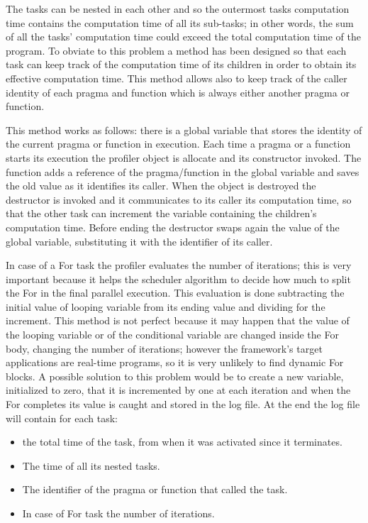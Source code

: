\documentclass[a4paper,11pt,oneside]{book}
\begin{document}
The tasks can be nested in each other and so the outermost tasks computation time contains the computation time of all its sub-tasks; in other words, the sum of all the tasks’ computation time could exceed the total computation time of the program. To obviate to this problem a method has been designed so that each task can keep track of the computation time of its children in order to obtain its effective computation time. This method allows also to keep track of the caller identity of each pragma and function which is always either another pragma or function.

This method works as follows: there is a global variable that stores the identity of the current pragma or function in execution. Each time a pragma or a function starts its execution the profiler object is allocate and its constructor invoked. The function adds a reference of the pragma/function in the global variable and saves the old value as it identifies its caller. When the object is destroyed the destructor is invoked and it communicates to its caller its computation time, so that the other task can increment the variable containing the children's computation time. Before ending the destructor swaps again the value of the global variable, substituting it with the identifier of its caller. 

In case of a For task the profiler evaluates the number of iterations; this is very important because it helps the scheduler algorithm to decide how much to split the For in the final parallel execution. This evaluation is done subtracting the initial value of looping variable from its ending value and dividing for the increment. This method is not perfect because it may happen that the value of the looping variable or of the conditional variable are changed inside the For body, changing the number of iterations; however the framework’s target applications are real-time programs, so it is very unlikely to find dynamic For blocks. A possible solution to this problem would be to create a new variable, initialized to zero, that it is incremented by one at each iteration and when the For completes its value is caught and stored in the log file. At the end the log file will contain for each task:

\begin{itemize}
\item the total time of the task, from when it was activated since it terminates.
\item The time of all its nested tasks.
\item The identifier of the pragma or function that called the task.
\item In case of For task the number of iterations.
\end{itemize}
\end{document}
